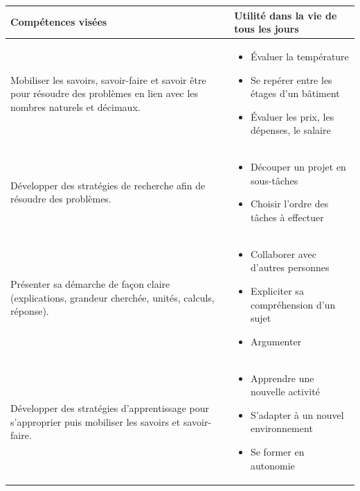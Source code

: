 \def\arraystretch{1.6}
\begin{tabularx}{\textwidth}{|>{\raggedright\arraybackslash}X|>{\raggedright\arraybackslash}X|}
\hline
\cellcolor{themeNO!30}Compétences visées & \cellcolor{themeNO!30}Utilité dans la vie de tous les jours \\
\hline
Mobiliser les savoirs, savoir-faire et savoir être pour résoudre des problèmes en lien avec les nombres naturels et décimaux.
&\vspace{-1em}
\begin{itemize}[leftmargin=*, itemsep=2pt, topsep=0pt, partopsep=0pt, parsep=0pt, label=$\triangleright$]
    \item Évaluer la température
    \item Se repérer entre les étages d'un bâtiment
    \item Évaluer les prix, les dépenses, le salaire
\end{itemize} \\
\hline

Développer des stratégies de recherche afin de résoudre des problèmes.
&\vspace{-1em}
\begin{itemize}[leftmargin=*, itemsep=2pt, topsep=0pt, label=$\triangleright$]
    \item Découper un projet en sous-tâches
    \item Choisir l'ordre des tâches à effectuer
\end{itemize} \\
\hline

Présenter sa démarche de façon claire (explications, grandeur cherchée, unités, calculs, réponse).
&\vspace{-1em}
\begin{itemize}[leftmargin=*, itemsep=2pt, topsep=0pt, label=$\triangleright$]
    \item Collaborer avec d'autres personnes
    \item Expliciter sa compréhension d'un sujet
    \item Argumenter
\end{itemize} \\
\hline

Développer des stratégies d'apprentissage pour s'approprier puis mobiliser les savoirs et savoir-faire.
&\vspace{-1em}
\begin{itemize}[leftmargin=*, itemsep=2pt, topsep=0pt, label=$\triangleright$]
    \item Apprendre une nouvelle activité %
    \item S'adapter à un nouvel environnement %
    \item Se former en autonomie %
\end{itemize} \\
\hline


\end{tabularx}
